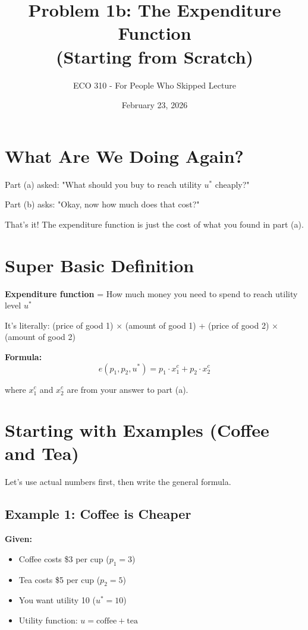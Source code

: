 \documentclass[11pt]{article}
\title{Problem 1b: The Expenditure Function \\ (Starting from Scratch)}
\author{ECO 310 - For People Who Skipped Lecture}
\date{February 23, 2026}
\begin{document}
\maketitle

\section{What Are We Doing Again?}

Part (a) asked: "What should you buy to reach utility $u^*$ cheaply?"

Part (b) asks: "Okay, now how much does that cost?"

That's it! The expenditure function is just the cost of what you found in part (a).

\section{Super Basic Definition}

\begin{tcolorbox}[colback=blue!5!white,colframe=blue!75!black,title=Expenditure Function]
\textbf{Expenditure function} = How much money you need to spend to reach utility level $u^*$

It's literally: (price of good 1) $\times$ (amount of good 1) + (price of good 2) $\times$ (amount of good 2)
\end{tcolorbox}

\textbf{Formula:}
$$e(p_1, p_2, u^*) = p_1 \cdot x_1^c + p_2 \cdot x_2^c$$

where $x_1^c$ and $x_2^c$ are from your answer to part (a).

\section{Starting with Examples (Coffee and Tea)}

Let's use actual numbers first, then write the general formula.

\subsection{Example 1: Coffee is Cheaper}

\textbf{Given:}
\begin{itemize}
\item Coffee costs \$3 per cup ($p_1 = 3$)
\item Tea costs \$5 per cup ($p_2 = 5$)
\item You want utility 10 ($u^* = 10$)
\item Utility function: $u = \text{coffee} + \text{tea}$
\end{itemize}
\end{document}
